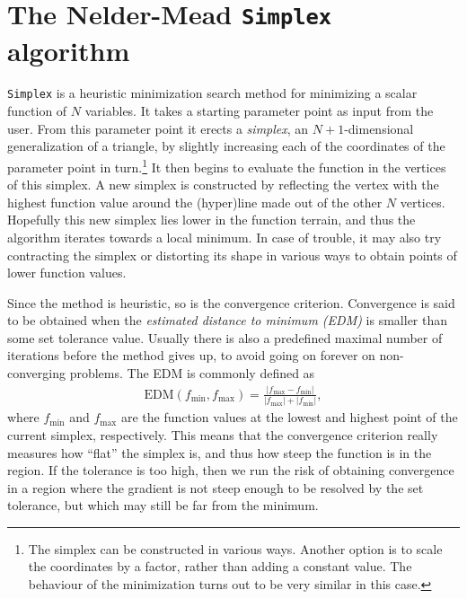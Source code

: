 \documentclass[twoside,english]{uiofysmaster}
\begin{document}
\section{The Nelder-Mead {\tt Simplex} algorithm}
\label{sec:simplex_discussion}
{\tt Simplex} \cite{nelder1965simplex} is a heuristic minimization search method for minimizing a scalar function of $N$ variables. It takes a starting parameter point as input from the user. From this parameter point it erects a {\it simplex}, an $N+1$-dimensional generalization of a triangle, by slightly increasing each of the coordinates of the parameter point in turn.\footnote{The simplex can be constructed in various ways. Another option is to scale the coordinates by a factor, rather than adding a constant value. The behaviour of the minimization turns out to be very similar in this case.} It then begins to evaluate the function in the vertices of this simplex. A new simplex is constructed by reflecting the vertex with the highest function value around the (hyper)line made out of the other $N$ vertices. Hopefully this new simplex lies lower in the function terrain, and thus the algorithm iterates towards a local minimum. In case of trouble, it may also try contracting the simplex or distorting its shape in various ways to obtain points of lower function values. 

Since the method is heuristic, so is the convergence criterion. Convergence is said to be obtained when the {\it estimated distance to minimum (EDM)} is smaller than some set tolerance value. Usually there is also a predefined maximal number of iterations before the method gives up, to avoid going on forever on non-converging problems. The EDM is commonly defined as
\begin{align}
	\mathrm{EDM}(f_\mathrm{min},f_\mathrm{max}) = \frac{|f_\mathrm{max}-f_\mathrm{min}|}{|f_\mathrm{max}| + |f_\mathrm{min}|},
\end{align}
where $f_\mathrm{min}$ and $f_\mathrm{max}$ are the function values at the lowest and highest point of the current simplex, respectively. This means that the convergence criterion really measures how ``flat'' the simplex is, and thus how steep the function is in the region. If the tolerance is too high, then we run the risk of obtaining convergence in a region where the gradient is not steep enough to be resolved by the set tolerance, but which may still be far from the minimum.
\end{document}
